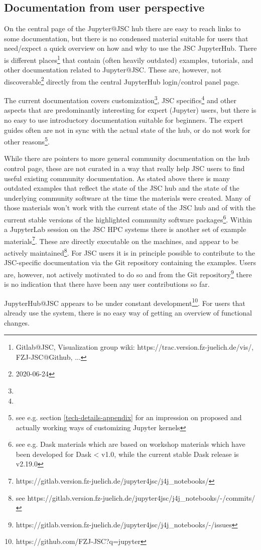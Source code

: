 
\subsection{Documentation from user perspective}
\label{s-doc-from-user-pov}

On the central page of the Jupyter@JSC hub there are easy to reach links to some documentation, but there is no condensed material suitable for users that need/expect a quick overview on how and why to use the JSC JupyterHub.
There is different places\footnote{Gitlab@JSC, Visualization group wiki: https://trac.version.fz-juelich.de/vis/, FZJ-JSC@Github, ...} that contain (often heavily outdated) examples, tutorials, and other documentation related to Jupyter@JSC.
These are, however, not discoverable\footnote{2020-06-24} directly from the central JupyterHub login/control panel page.

The current documentation covers customization\footnote{}, JSC specifics\footnote{} and other aspects that are predominantly interesting for expert (Jupyter) users, but there is no easy to use introductory documentation suitable for beginners.
The expert guides often are not in sync with the actual state of the hub, or do not work for other reasons\footnote{see e.g. section \ref{tech-details-appendix} for an impression on proposed and actually working ways of customizing Jupyter kernels}.

While there are pointers to more general community documentation on the hub control page, these are not curated in a way that really help JSC users to find useful existing community documentation.
As stated above there is many outdated examples that reflect the state of the JSC hub and the state of the underlying community software at the time the materials were created.
Many of those materials won't work with the current state of the JSC hub and of with the current stable versions of the highlighted community software packages\footnote{see e.g. Dask materials which are based on workshop materials which have been developed for Dask < v1.0, while the current stable Dask release is v2.19.0}.
Within a JupyterLab session on the JSC HPC systems there is another set of example materials\footnote{https://gitlab.version.fz-juelich.de/jupyter4jsc/j4j_notebooks/}.
These are directly executable on the machines, and appear to be actively maintained\footnote{see https://gitlab.version.fz-juelich.de/jupyter4jsc/j4j_notebooks/-/commits/}.
For JSC users it is in principle possible to contribute to the JSC-specific documentation via the Git repository containing the examples.
Users are, however, not actively motivated to do so and from the Git repository\footnote{https://gitlab.version.fz-juelich.de/jupyter4jsc/j4j_notebooks/-/issues} there is no indication that there have been any user contributions so far.

JupyterHub@JSC appears to be under constant development\footnote{https://github.com/FZJ-JSC?q=jupyter}.
For users that already use the system, there is no easy way of getting an overview of functional changes.
